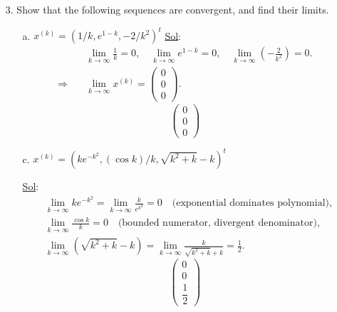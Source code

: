 \begin{enumerate}
  \item[3.] Show that the following sequences are convergent, and
    find their limits.
    \begin{enumerate}
      \item[a.] \(x^{(k)} = (1/k, e^{1 - k}, -2/k^2)^t\)
        \underline{Sol}:\\
        \[
          \begin{aligned}
            &\lim_{k \to \infty} \frac{1}{k} = 0, \quad
            \lim_{k \to \infty} e^{1 - k} = 0, \quad
            \lim_{k \to \infty} \left(-\frac{2}{k^2}\right) = 0. \\
            \Rightarrow \quad &\lim_{k \to \infty} x^{(k)} =
            \begin{pmatrix} 0 \\ 0 \\ 0
            \end{pmatrix}.
          \end{aligned}
        \]
        \[
          \boxed{
            \begin{pmatrix} 0 \\ 0 \\ 0
          \end{pmatrix}}
        \]

      \item[c.] \(x^{(k)} = (ke^{-k^2}, (\cos k)/k, \sqrt{k^2 + k}-k)^t\)

        \underline{Sol}:\\
        \[
          \begin{aligned}
            &\lim_{k \to \infty} ke^{-k^2} = \lim_{k \to \infty}
            \frac{k}{e^{k^2}} = 0 \quad \text{(exponential dominates
            polynomial)}, \\
            &\lim_{k \to \infty} \frac{\cos k}{k} = 0 \quad
            \text{(bounded numerator, divergent denominator)}, \\
            &\lim_{k \to \infty} \left(\sqrt{k^2 + k} - k\right) =
            \lim_{k \to \infty} \frac{k}{\sqrt{k^2 + k} + k} = \frac{1}{2}.
          \end{aligned}
        \]
        \[
          \boxed{
            \begin{pmatrix} 0 \\ 0 \\ \dfrac{1}{2}
          \end{pmatrix}}
        \]
    \end{enumerate}


\end{enumerate}
